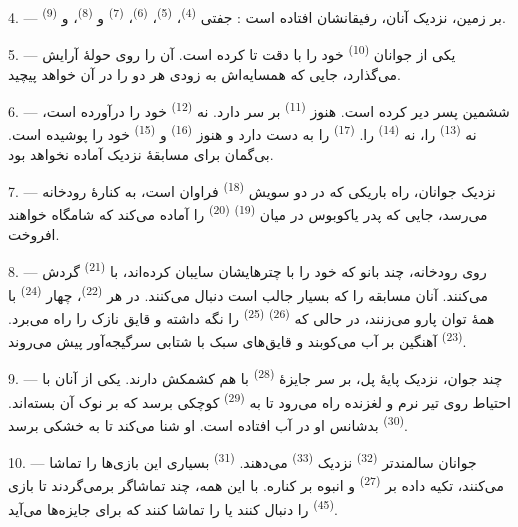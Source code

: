 4. --- بر زمین، نزدیک آنان،  رفیقانشان افتاده است :
جفتی  \textsuperscript{(4)}، 
\textsuperscript{(5)}،  \textsuperscript{(6)}،
 \textsuperscript{(7)} و 
\textsuperscript{(8)}، و  \textsuperscript{(9)}.

5. --- یکی از جوانان  \textsuperscript{(10)} خود را
با دقت تا کرده است. آن را روی حولهٔ آرایش می‌گذارد، جایی که همسایه‌اش
به زودی هر دو  را در آن خواهد پیچید.

6. --- ششمین پسر دیر کرده است. هنوز 
\textsuperscript{(11)} بر سر دارد. نه 
\textsuperscript{(12)} خود را درآورده است، نه 
\textsuperscript{(13)} را، نه  \textsuperscript{(14)}
را.  \textsuperscript{(17)} را به دست دارد و هنوز
 \textsuperscript{(16)} و 
\textsuperscript{(15)} خود را پوشیده است. بی‌گمان برای مسابقهٔ نزدیک
آماده نخواهد بود.

7. --- نزدیک جوانان، راه باریکی که در دو سویش 
\textsuperscript{(18)} فراوان است، به کنارهٔ رودخانه می‌رسد، جایی که
پدر یاکوبوس در میان  \textsuperscript{(19)}
 \textsuperscript{(20)} را آماده می‌کند که شامگاه
خواهند افروخت.

\VUsaut{4.4mm}
\VUsaut{3.4mm}

8. --- روی رودخانه، چند بانو که خود را با چترهایشان سایبان کرده‌اند، با
 \textsuperscript{(21)} گردش می‌کنند. آنان مسابقه را که
بسیار جالب است دنبال می‌کنند. در هر 
\textsuperscript{(22)}، چهار  \textsuperscript{(24)} با
همهٔ توان پارو می‌زنند، در حالی که 
\textsuperscript{(26)}  \textsuperscript{(25)} را نگه
داشته و قایق نازک را راه می‌برد. 
\textsuperscript{(23)} آهنگین بر آب می‌کوبند و قایق‌های سبک با شتابی
سرگیجه‌آور پیش می‌روند.

9. --- چند جوان، نزدیک پایهٔ پل، بر سر جایزهٔ 
\textsuperscript{(28)} با هم کشمکش دارند. یکی از آنان با احتیاط روی تیر
نرم و لغزنده راه می‌رود تا به  \textsuperscript{(29)}
کوچکی برسد که بر نوک آن بسته‌اند. 
\textsuperscript{(30)} بدشانس او در آب افتاده است. او شنا می‌کند تا به
خشکی برسد.

10. --- جوانان سالمندتر  \textsuperscript{(32)}
نزدیک  \textsuperscript{(33)} می‌دهند. 
\textsuperscript{(31)} بسیاری این بازی‌ها را تماشا می‌کنند، تکیه داده
بر   \textsuperscript{(27)} و انبوه بر
کناره. با این همه، چند تماشاگر برمی‌گردند تا بازی 
\textsuperscript{(45)} را دنبال کنند یا  را
تماشا کنند که برای  جایزه‌ها می‌آید.


